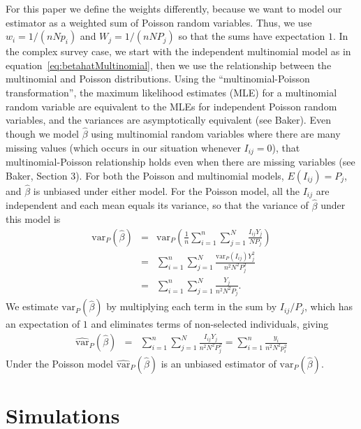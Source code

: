 \documentclass[AMA,STIX1COL]{WileyNJD-v2}
\begin{document}
For this paper we define the weights differently, because we want to model our estimator as a weighted sum of Poisson random variables.
Thus, we use $w_i = 1/(nNp_i)$ and $W_j= 1/(nNP_j)$ so that the sums have expectation $1$.
In the complex survey case,
we start with the independent multinomial model as in equation~\ref{eq:betahatMultinomial}, then we use the relationship between the multinomial and Poisson distributions.
Using the ``multinomial-Poisson transformation'', the maximum
likelihood estimates (MLE) for a multinomial random variable are equivalent to the MLEs for independent Poisson random variables, and
the variances are asymptotically equivalent (see Baker\cite{Baker:1994}).
Even though we model $\hat{\beta}$ using multinomial random variables where there are many missing values (which occurs in our situation whenever $I_{ij}=0$),
that multinomial-Poisson relationship holds even when there are missing variables (see Baker\cite{Baker:1994}, Section 3).
For both the Poisson and multinomial models, $E(I_{ij}) = P_j$, and $\hat{\beta}$ is unbiased under either model.
For the Poisson model, all the $I_{ij}$ are independent and each mean equals its variance, so that the variance of $\hat{\beta}$ under this model is
\begin{eqnarray*}
\textrm{var}_P \left(\hat{\beta} \right) & = & \textrm{var}_P \left(  \frac{1}{n}  \sum_{i=1}^{n} \sum_{j=1}^{N}  \frac{ I_{ij}  Y_j}{N P_j} \right)  \\
& = &    \sum_{i=1}^{n} \sum_{j=1}^{N}  \frac{ \textrm{var}_P( I_{ij})  Y_j^2}{n^2 N^2 P_j^2}  \\
& = &    \sum_{i=1}^{n} \sum_{j=1}^{N}  \frac{   Y_j}{n^2 N^2 P_j}.
\end{eqnarray*}
We estimate $\textrm{var}_P \left(\hat{\beta} \right)$ by multiplying each term in the sum by $I_{ij}/P_j$, which has an expectation of $1$ and eliminates terms of non-selected individuals, giving
\begin{eqnarray}
\widehat{\textrm{var}}_P \left(\hat{\beta} \right)
& = &   \sum_{i=1}^{n} \sum_{j=1}^{N}  \frac{ I_{ij}  Y_j}{n^2 N^2 P_j^2}  =  \sum_{i=1}^{n}  \frac{  y_i}{n^2 N^2 p_i^2} \label{eq:hatvarbetahat1}
\end{eqnarray}
Under the Poisson model $\widehat{\textrm{var}}_P \left(\hat{\beta} \right)$ is an unbiased estimator of $\textrm{var}_P \left(\hat{\beta} \right)$.



\section{Simulations}
\end{document}

